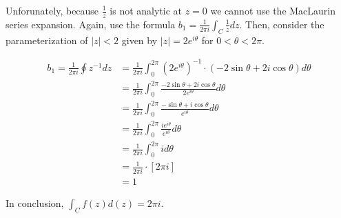 \documentclass[11pt]{article}
\begin{document}
\begin{enumerate}
\begin{enumerate}
		Unforunately, because $\frac{1}{z}$ is not analytic at $z = 0$ we cannot use the MacLaurin series expansion. Again, use the formula 
		$b_1 = \frac{1}{2\pi i} \int_C \frac{1}{z} dz$. Then, consider the parameterization of $|z| < 2$ given by $|z| = 2e^{i\theta}$ for $0 < \theta < 2\pi$.
		
		\[\begin{aligned}
		b_1 = \frac{1}{2\pi i} \oint z^{-1} dz
		&= \frac{1}{2\pi i} \int_0^{2\pi} (2e^{i\theta})^{-1} \cdot (-2\sin{\theta} + 2i\cos{\theta}) d\theta \\
		&= \frac{1}{2\pi i} \int_0^{2\pi} 
			\frac{-2\sin{\theta} + 2i\cos{\theta}}{2e^{i\theta}} d\theta \\
		&= \frac{1}{2\pi i} \int_0^{2\pi} 
		\frac{-\sin{\theta} + i\cos{\theta}}{e^{i\theta}} d\theta \\
		&= \frac{1}{2\pi i} \int_0^{2\pi} 
		\frac{ie^{i\theta}}{e^{i\theta}} d\theta \\
		&= \frac{1}{2\pi i} \int_0^{2\pi} i d\theta \\
		&= \frac{1}{2\pi i} \cdot [2\pi i] \\
		&= 1
		\end{aligned}\]
		
		In conclusion, $\int_C f(z) d(z) = 2\pi i$.
		
	\end{enumerate}
\end{enumerate}
\end{document}
